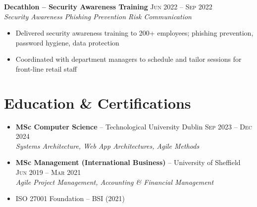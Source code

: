 \documentclass{simpleresume}
\begin{document}
\vspace{0.06cm}
\noindent\textbf{Decathlon -- Security Awareness Training}
  \hfill{\sffamily\scshape\small\color{muted}Jun 2022 -- Sep 2022}\\
  {\itshape\color{accent}\footnotesize Security Awareness \quad\textbullet\quad Phishing Prevention \quad\textbullet\quad Risk Communication}
\vspace{-0.25mm}
\begin{itemize}
  \item Delivered security awareness training to 200+ employees; phishing prevention, password hygiene, data protection
  \item Coordinated with department managers to schedule and tailor sessions for front-line retail staff
\end{itemize}
\section{Education \& Certifications}
\begin{itemize}
  \item\textbf{MSc Computer Science} -- Technological University Dublin
    \hfill{\sffamily\scshape\small\color{muted}Sep 2023 -- Dec 2024}
    \\[0.08cm]
    {\itshape\color{secondary}Systems Architecture, Web App Architectures, Agile Methods}
  \item\textbf{MSc Management (International Business)} -- University of Sheffield
    \hfill{\sffamily\scshape\small\color{muted}Jun 2019 -- Mar 2021}
    \\[0.08cm]
    {\itshape\color{secondary}Agile Project Management, Accounting \& Financial Management}
  \item ISO 27001 Foundation -- BSI (2021)
\end{itemize}
\end{document}
